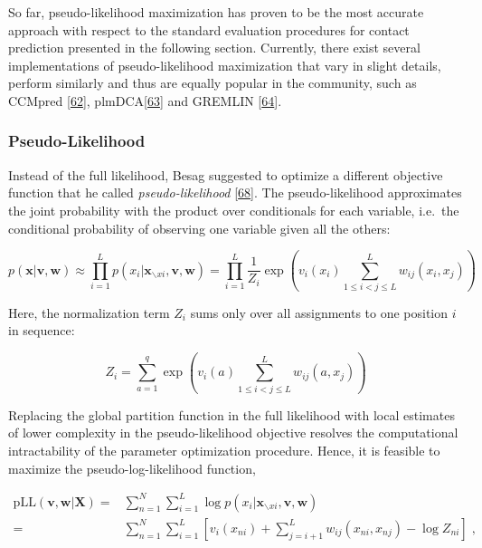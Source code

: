 \documentclass[12pt,a4paper,twoside]{book}
\newcommand{\seq}{\mathbf{x}}
\renewcommand{\v}{\mathbf{v}}
\newcommand{\w}{\mathbf{w}}
\theoremstyle{definition}
\theoremstyle{definition}
\theoremstyle{remark}
\begin{document}
So far, pseudo-likelihood maximization has proven to be the most
accurate approach with respect to the standard evaluation procedures for
contact prediction presented in the following section. Currently, there
exist several implementations of pseudo-likelihood maximization that
vary in slight details, perform similarly and thus are equally popular
in the community, such as CCMpred
{[}\protect\hyperlink{ref-Seemayer2014}{62}{]},
plmDCA{[}\protect\hyperlink{ref-Ekeberg2014}{63}{]} and GREMLIN
{[}\protect\hyperlink{ref-Kamisetty2013}{64}{]}.

\subsubsection{Pseudo-Likelihood}\label{pseudo-likelihood}

Instead of the full likelihood, Besag suggested to optimize a different
objective function that he called \emph{pseudo-likelihood}
{[}\protect\hyperlink{ref-Besag1975}{68}{]}. The pseudo-likelihood
approximates the joint probability with the product over conditionals
for each variable, i.e.~the conditional probability of observing one
variable given all the others:

\begin{equation}
  p(\seq | \v,\w) \approx   \prod_{i=1}^L p(x_i | \seq_{\backslash xi}, \v,\w) =  \prod_{i=1}^L \frac{1}{Z_i} \exp \left(  v_i(x_i) \sum_{1 \leq i < j \leq L}^L w_{ij}(x_i, x_j) \right)
\end{equation}

Here, the normalization term \(Z_i\) sums only over all assignments to
one position \(i\) in sequence:

\begin{equation}
  Z_i = \sum_{a=1}^{q} \exp \left( v_i(a) \sum_{1 \leq i < j \leq L}^L w_{ij}(a, x_j) \right)
\label{eq:partition-fct-pll}
\end{equation}

Replacing the global partition function in the full likelihood with
local estimates of lower complexity in the pseudo-likelihood objective
resolves the computational intractability of the parameter optimization
procedure. Hence, it is feasible to maximize the pseudo-log-likelihood
function,

\begin{align}
    \text{pLL}(\v, \w | \mathbf{X}) =& \sum_{n=1}^N \sum_{i=1}^L \log p(x_i | \seq_{\backslash xi}, \v,\w) \\
    =& \sum_{n=1}^N \sum_{i=1}^L  \left[ v_i(x_{ni}) + \sum_{j=i+1}^L  w_{ij}(x_{ni}, x_{nj}) - \log Z_{ni} \right] \;,
\end{align}
\end{document}
